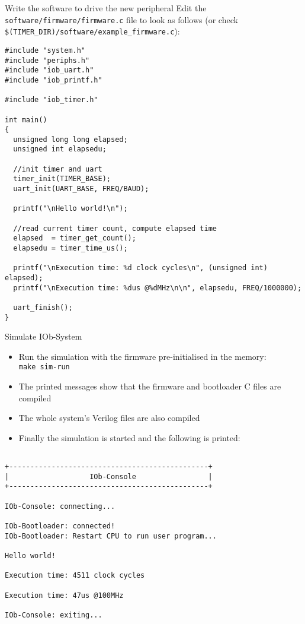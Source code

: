 \documentclass [xcolor=svgnames, t] {beamer}
\begin{document}
\begin{frame}[fragile]{Write the software to drive the new peripheral}
    Edit the {\tt software/firmware/firmware.c} file to look as follows (or check
    {\tt \$(TIMER\_DIR)/software/example\_firmware.c}):
  \begin{tiny}
    \begin{lstlisting}
#include "system.h"
#include "periphs.h"
#include "iob_uart.h"
#include "iob_printf.h"

#include "iob_timer.h"

int main()
{
  unsigned long long elapsed;
  unsigned int elapsedu;

  //init timer and uart
  timer_init(TIMER_BASE);
  uart_init(UART_BASE, FREQ/BAUD);

  printf("\nHello world!\n");

  //read current timer count, compute elapsed time
  elapsed  = timer_get_count();
  elapsedu = timer_time_us();

  printf("\nExecution time: %d clock cycles\n", (unsigned int) elapsed);
  printf("\nExecution time: %dus @%dMHz\n\n", elapsedu, FREQ/1000000);

  uart_finish();
}
    \end{lstlisting}
  \end{tiny}
\end{frame}


\begin{frame}[fragile]{Simulate IOb-System}
\begin{itemize}
\item Run the simulation with the firmware pre-initialised in the memory:\\
  {\tt make sim-run}
\item The printed messages show that the firmware and bootloader C files are compiled
\item The whole system's Verilog files are also compiled
\item Finally the simulation is started and the following is printed:
\end{itemize}

\begin{tiny}
  \begin{lstlisting}

+-----------------------------------------------+
|                   IOb-Console                 |
+-----------------------------------------------+

IOb-Console: connecting...

IOb-Bootloader: connected!
IOb-Bootloader: Restart CPU to run user program...

Hello world!

Execution time: 4511 clock cycles

Execution time: 47us @100MHz

IOb-Console: exiting...

  \end{lstlisting}
\end{tiny}
\end{frame}
\end{document}
